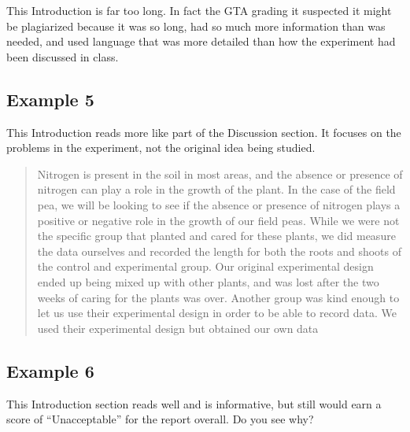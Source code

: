 \documentclass[
]{book}
\begin{document}
This Introduction is far too long. In fact the GTA grading it suspected it might be plagiarized because it was so long, had so much more information than was needed, and used language that was more detailed than how the experiment had been discussed in class.

\hypertarget{example-5}{%
\subsection{Example 5}\label{example-5}}

This Introduction reads more like part of the Discussion section. It focuses on the problems in the experiment, not the original idea being studied.

\begin{quote}
Nitrogen is present in the soil in most areas, and the absence or presence of nitrogen can play a role in the growth of the plant. In the case of the field pea, we will be looking to see if the absence or presence of nitrogen plays a positive or negative role in the growth of our field peas. While we were not the specific group that planted and cared for these plants, we did measure the data ourselves and recorded the length for both the roots and shoots of the control and experimental group. Our original experimental design ended up being mixed up with other plants, and was lost after the two weeks of caring for the plants was over. Another group was kind enough to let us use their experimental design in order to be able to record data. We used their experimental design but obtained our own data
\end{quote}

\hypertarget{example-6}{%
\subsection{Example 6}\label{example-6}}

This Introduction section reads well and is informative, but still would earn a score of ``Unacceptable'' for the report overall. Do you see why?
\end{document}

